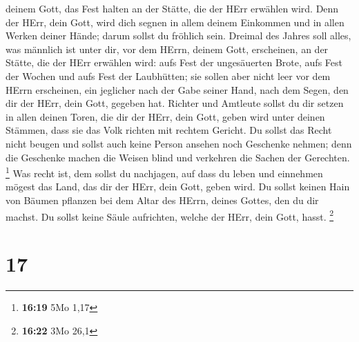 deinem Gott, das Fest halten an der Stätte, die der HErr erwählen wird.
Denn der HErr, dein Gott, wird dich segnen in allem deinem Einkommen und
in allen Werken deiner Hände; darum sollst du fröhlich sein.
 Dreimal des Jahres soll alles, was männlich ist unter
dir, vor dem HErrn, deinem Gott, erscheinen, an der Stätte, die der HErr
erwählen wird: aufs Fest der ungesäuerten Brote, aufs Fest der Wochen
und aufs Fest der Laubhütten; sie sollen aber nicht leer vor dem HErrn
erscheinen,  ein jeglicher nach der Gabe seiner Hand,
nach dem Segen, den dir der HErr, dein Gott, gegeben hat.
 Richter und Amtleute sollst du dir setzen in allen
deinen Toren, die dir der HErr, dein Gott, geben wird unter deinen
Stämmen, dass sie das Volk richten mit rechtem Gericht. 
Du sollst das Recht nicht beugen und sollst auch keine Person ansehen
noch Geschenke nehmen; denn die Geschenke machen die Weisen blind und
verkehren die Sachen der Gerechten. \footnote{\textbf{16:19} 5Mo 1,17}
 Was recht ist, dem sollst du nachjagen, auf dass du
leben und einnehmen mögest das Land, das dir der HErr, dein Gott, geben
wird.  Du sollst keinen Hain von Bäumen pflanzen bei dem
Altar des HErrn, deines Gottes, den du dir machst.  Du
sollst keine Säule aufrichten, welche der HErr, dein Gott, hasst.
\footnote{\textbf{16:22} 3Mo 26,1}

\hypertarget{section-16}{%
\section{17}\label{section-16}}

